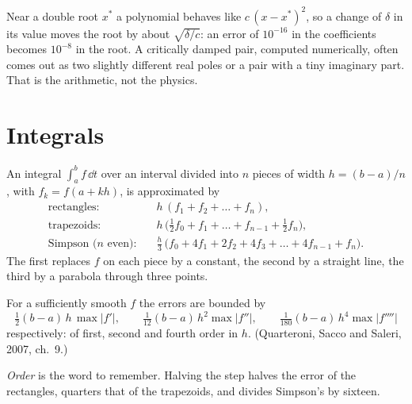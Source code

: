 \begin{watchout}
Near a double root $x^*$ a polynomial behaves like $c\,(x - x^*)^2$, so a change of $\delta$ in its value moves the root by about $\sqrt{\delta/c}$: an error of $10^{-16}$ in the coefficients becomes $10^{-8}$ in the root. A critically damped pair, computed numerically, often comes out as two slightly different real poles or a pair with a tiny imaginary part. That is the arithmetic, not the physics.
\end{watchout}

\section{Integrals}

An integral $\int_a^b f\,\dd t$ over an interval divided into $n$ pieces of width $h = (b - a)/n$, with $f_k = f(a + kh)$, is approximated by
\begin{align}
  \text{rectangles:} \quad & h\,(f_1 + f_2 + \dots + f_n), \\
  \text{trapezoids:} \quad & h\,\big(\tfrac12f_0 + f_1 + \dots + f_{n-1} + \tfrac12f_n\big), \\
  \text{Simpson ($n$ even):} \quad & \tfrac{h}{3}\,\big(f_0 + 4f_1 + 2f_2 + 4f_3 + \dots + 4f_{n-1} + f_n\big) .
\end{align}
The first replaces $f$ on each piece by a constant, the second by a straight line, the third by a parabola through three points.

\begin{theorem}
\label{thm:F-quad}
For a sufficiently smooth $f$ the errors are bounded by
\begin{equation*}
  \tfrac12(b - a)\,h\,\max|f'|, \qquad \tfrac{1}{12}(b - a)\,h^2\max|f''|, \qquad \tfrac{1}{180}(b - a)\,h^4\max|f''''|
\end{equation*}
respectively: of first, second and fourth order in $h$. (Quarteroni, Sacco and Saleri, 2007, ch.~9.)
\end{theorem}

\emph{Order} is the word to remember. Halving the step halves the error of the rectangles, quarters that of the trapezoids, and divides Simpson's by sixteen.

